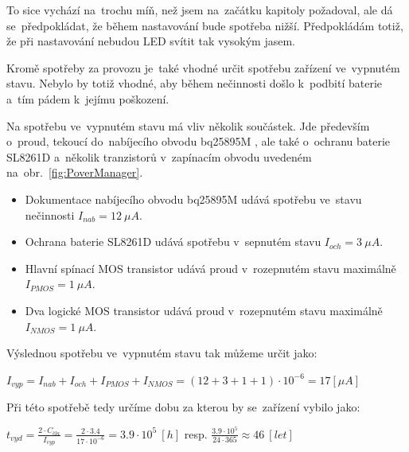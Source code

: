 To sice vychází na~trochu míň, než jsem na~začátku kapitoly požadoval, ale dá se~předpokládat, že během nastavování bude spotřeba nižší.
Předpokládám totiž, že při nastavování nebudou LED svítit tak vysokým jasem.


Kromě spotřeby za provozu je~také vhodné určit spotřebu zařízení ve~vypnutém stavu.
Nebylo by totiž vhodné, aby během nečinnosti došlo k~podbití baterie a~tím pádem k~jejímu poškození.

Na spotřebu ve~vypnutém stavu má vliv několik součástek.
Jde především o~proud, tekoucí do~nabíjecího obvodu bq25895M \cite{BQ25895}, ale také o~ochranu baterie SL8261D \cite{SL8261} a~několik tranzistorů v~zapínacím obvodu uvedeném na~obr.~\ref{fig:PoverManager}.

\begin{itemize}
    \item Dokumentace nabíjecího obvodu bq25895M \cite{BQ25895} udává spotřebu ve~stavu nečinnosti \(I_{nab} = 12~\mu A\).
    \item Ochrana baterie SL8261D \cite{SL8261} udává spotřebu v~sepnutém stavu \(I_{och} = 3~\mu A\).
    \item Hlavní spínací MOS transistor \cite{WSD20L75DN33} udává proud v~rozepnutém stavu maximálně \(I_{PMOS} = 1~\mu A\).
    \item Dva logické MOS transistor \cite{N-MOS} udává proud v~rozepnutém stavu maximálně \(I_{NMOS} = 1~\mu A\).
\end{itemize}

Výslednou spotřebu ve~vypnutém stavu tak můžeme určit jako:

\vspace{5mm}
\large
\begin{centering}
\(
    I_{vyp} = I_{nab} + I_{och} + I_{PMOS} + I_{NMOS} = (12 + 3 + 1 + 1) \cdot 10^{-6} = 17 [\mu A]
\)
\end{centering}
\normalsize
\vspace{1mm}

Při této spotřebě tedy určíme dobu za kterou by se~zařízení vybilo jako:

\vspace{5mm}
\large
\begin{centering}
\(
    t_{vyd} = \frac{2 \cdot C_{čla}}{I_{vyp}} = \frac{2 \cdot 3.4}{17 \cdot 10^{-6}} = 3.9\cdot10^{5}~[h] \) resp. \(\frac{3.9\cdot10^{5}}{24\cdot365} \approx 46~[let]\)
\end{centering}
\normalsize
\vspace{1mm}

